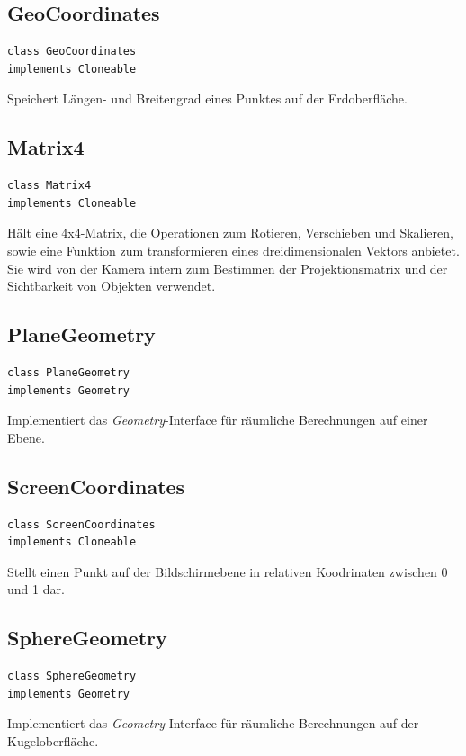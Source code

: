 \documentclass[10pt]{scrreprt}
\begin{document}
\vspace{5mm}
\subsection*{GeoCoordinates}
\begin{lstlisting}
class GeoCoordinates
implements Cloneable
\end{lstlisting}
Speichert Längen- und Breitengrad eines Punktes auf der Erdoberfläche.\\

\vspace{5mm}
\subsection*{Matrix4}
\begin{lstlisting}
class Matrix4
implements Cloneable
\end{lstlisting}
Hält eine 4x4-Matrix, die Operationen zum Rotieren, Verschieben und Skalieren, sowie eine Funktion zum transformieren eines dreidimensionalen Vektors anbietet. Sie wird von der Kamera intern zum Bestimmen der Projektionsmatrix und der Sichtbarkeit von Objekten verwendet.\\

\vspace{5mm}
\subsection*{PlaneGeometry}
\begin{lstlisting}
class PlaneGeometry
implements Geometry
\end{lstlisting}
Implementiert das \textit{Geometry}-Interface für räumliche Berechnungen auf einer Ebene.\\

\vspace{5mm}
\subsection*{ScreenCoordinates}
\begin{lstlisting}
class ScreenCoordinates
implements Cloneable
\end{lstlisting}
Stellt einen Punkt auf der Bildschirmebene in relativen Koodrinaten zwischen 0 und 1 dar.\\

\newpage
\vspace{5mm}
\subsection*{SphereGeometry}
\begin{lstlisting}
class SphereGeometry
implements Geometry
\end{lstlisting}
Implementiert das \textit{Geometry}-Interface für räumliche Berechnungen auf der Kugeloberfläche.\\
\end{document}
